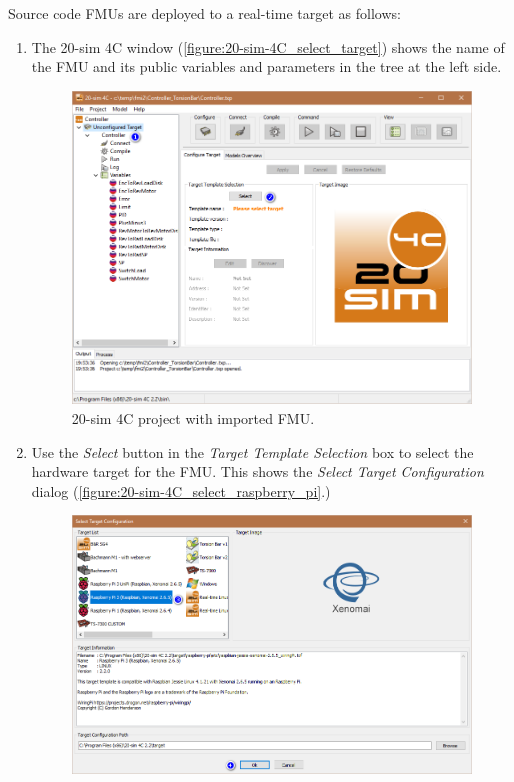 Source code FMUs are deployed to a real-time target as follows:
%
%
%
\begin{enumerate}
\item The 20-sim 4C window (\autoref{figure:20-sim-4C_select_target}) shows the name of the FMU and its public variables and parameters in the tree at the left side.
% 
\begin{figure}[hpt]
	\centerline{\includegraphics[width=\textwidth]{figures/20-sim-4C_select_target.png}}
	\caption{20-sim 4C project with imported FMU.}
	\label{figure:20-sim-4C_select_target}
\end{figure}
%
\item Use the \textit{Select} button in the \textit{Target Template Selection} box to select the hardware target for the FMU.  This shows the \textit{Select Target Configuration} dialog (\autoref{figure:20-sim-4C_select_raspberry_pi}.)
%
\begin{figure}[hpt]
	\centerline{\includegraphics[width=\textwidth]{figures/20-sim-4C_select_raspberry_pi.png}}

\end{figure}
\end{enumerate}
